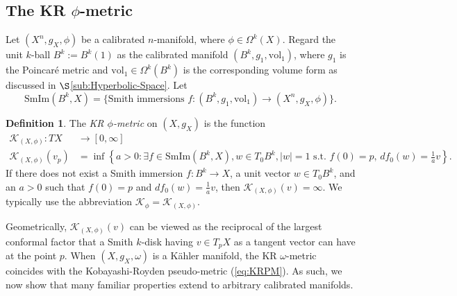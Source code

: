 \documentclass[11pt]{article}
\newcommand{\vol}{\mathrm{vol}}
\theoremstyle{definition}
\newtheorem{defn}[thm]{Definition}
\numberwithin{equation}{section}
\begin{document}
\subsection{The KR $\phi$-metric} \label{sub:KR}

\indent \indent Let $(X^n, g_X, \phi)$ be a calibrated $n$-manifold, where $\phi \in \Omega^k(X)$.   Regard the unit $k$-ball $B^k := B^k(1)$ as the calibrated manifold $(B^k, g_1, \vol_1)$, where $g_1$ is the Poincar\'{e} metric and $\vol_1 \in \Omega^k(B^k)$ is the corresponding volume form as discussed in $\S$\ref{sub:Hyperbolic-Space}.  Let
$$\mathrm{SmIm}(B^k, X) = \{\text{Smith immersions } f\colon (B^k, g_1, \vol_1) \to (X^n, g_X, \phi)\}.$$

\begin{defn} The \emph{KR $\phi$-metric} on $(X, g_X)$ is the function
\begin{align*}
\mathcal{K}_{(X,\phi)} \colon TX & \to [0,  \infty] \\
\mathcal{K}_{(X,\phi)}(v_p) & = \inf\!\left\{ a > 0 \colon \exists f \in \mathrm{SmIm}(B^k, X), w \in T_0B^k, |w| = 1 \text{ s.t. } f(0) = p,\, df_0(w) = \frac{1}{a}v \right\}\!.
\end{align*}
If there does not exist a Smith immersion $f \colon B^k \to X$, a unit vector $w \in T_0B^k$, and an $a > 0$ such that $f(0) = p$ and $df_0(w) = \frac{1}{a}v$, then $\mathcal{K}_{(X,\phi)}(v) = \infty$.  We typically use the abbreviation $\mathcal{K}_\phi = \mathcal{K}_{(X,\phi)}$.  
\end{defn}

\indent  Geometrically, $\mathcal{K}_{(X,\phi)}(v)$ can be viewed as the reciprocal of the largest conformal factor that a Smith $k$-disk having $v \in T_pX$ as a tangent vector can have at the point $p$.  When $(X, g_X, \omega)$ is a K\"{a}hler manifold, the KR $\omega$-metric coincides with the Kobayashi-Royden pseudo-metric (\ref{eq:KRPM}).  As such, we now show that many familiar properties extend to arbitrary calibrated manifolds.
\end{document}

